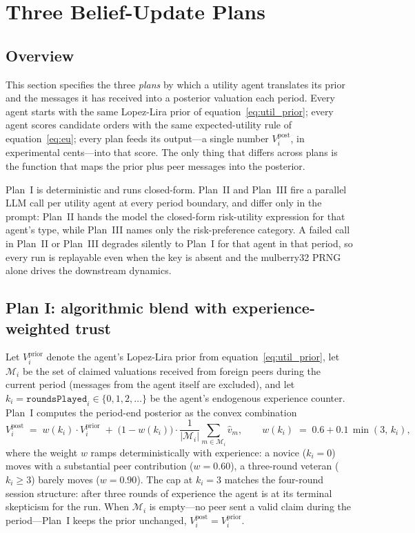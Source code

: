\section{Three Belief-Update Plans}
\label{sec:anchor}

\subsection{Overview}

This section specifies the three \emph{plans} by which a utility
agent translates its prior and the messages it has received into
a posterior valuation each period. Every agent starts with the same
Lopez-Lira prior of equation~\eqref{eq:util_prior}; every agent
scores candidate orders with the same expected-utility rule of
equation~\eqref{eq:eu}; every plan feeds its output---a single
number $V_i^{\text{post}}$, in experimental cents---into that
score. The only thing that differs across plans is the function
that maps the prior plus peer messages into the posterior.

Plan~I is deterministic and runs closed-form. Plan~II and Plan~III
fire a parallel LLM call per utility agent at every period boundary,
and differ only in the prompt: Plan~II hands the model the
closed-form risk-utility expression for that agent's type, while
Plan~III names only the risk-preference category. A failed call in
Plan~II or Plan~III degrades silently to Plan~I for that agent in
that period, so every run is replayable even when the key is
absent and the mulberry32 PRNG alone drives the downstream dynamics.

\subsection{Plan I: algorithmic blend with experience-weighted trust}
\label{sec:plan1}

Let $V_i^{\text{prior}}$ denote the agent's Lopez-Lira prior from
equation~\eqref{eq:util_prior}, let $\mathcal{M}_i$ be the set of
claimed valuations received from foreign peers during the current
period (messages from the agent itself are excluded), and let
$k_i=\texttt{roundsPlayed}_i\in\{0,1,2,\ldots\}$ be the agent's
endogenous experience counter. Plan~I computes the period-end
posterior as the convex combination
\begin{equation}
V_i^{\text{post}} \;=\; w(k_i)\cdot V_i^{\text{prior}}
\;+\;\bigl(1-w(k_i)\bigr)\cdot\frac{1}{|\mathcal{M}_i|}\sum_{m\in\mathcal{M}_i}\hat v_m,
\qquad
w(k_i) \;=\; 0.6 + 0.1\,\min(3,\,k_i),
\label{eq:plan1_body}
\end{equation}
where the weight $w$ ramps deterministically with experience: a
novice ($k_i=0$) moves with a substantial peer contribution
($w=0.60$), a three-round veteran ($k_i\ge 3$) barely moves
($w=0.90$). The cap at $k_i=3$ matches the four-round session
structure: after three rounds of experience the agent is at its
terminal skepticism for the run. When $\mathcal{M}_i$ is empty---no
peer sent a valid claim during the period---Plan~I keeps the prior
unchanged, $V_i^{\text{post}}=V_i^{\text{prior}}$.

